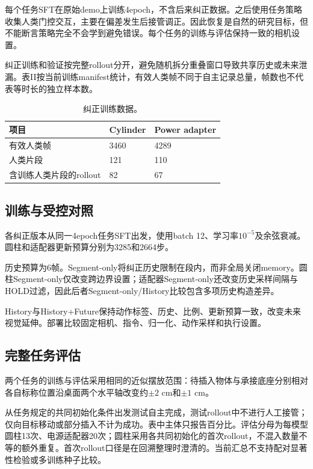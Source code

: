 \documentclass[letterpaper,10pt,conference]{ieeeconf}
\begin{document}
每个任务SFT在原始demo上训练4epoch，不含后来纠正数据。之后使用任务策略收集人类门控交互，主要在偏差发生后接管调正。因此恢复是自然的研究目标，但不能断言策略完全不会学到避免错误。每个任务的训练与评估保持一致的相机设置。

纠正训练和验证按完整rollout分开，避免随机拆分重叠窗口导致共享历史或未来泄漏。表II按当前训练manifest统计，有效人类帧不同于自主记录总量，帧数也不代表等时长的独立样本数。

\begin{table}[t]
\centering\small
\setlength{\tabcolsep}{3pt}
\caption{纠正训练数据。}
\begin{tabularx}{\columnwidth}{@{}Xll@{}}
\toprule
项目 & Cylinder & Power adapter \\
\midrule
有效人类帧 & 3460 & 4289 \\
人类片段 & 121 & 110 \\
含训练人类片段的rollout & 82 & 67 \\
\bottomrule
\end{tabularx}
\end{table}

\subsection{训练与受控对照}

各纠正版本从同一4epoch任务SFT出发，使用batch 12、学习率$10^{-5}$及余弦衰减。圆柱和适配器更新预算分别为3285和2664步。

历史预算为6帧。Segment-only将纠正历史限制在段内，而非全局关闭memory。圆柱Segment-only仅改变跨边界设置；适配器Segment-only还改变历史采样间隔与HOLD过滤，因此后者Segment-only/History比较包含多项历史构造差异。

History与History+Future保持动作标签、历史、比例、更新预算一致，改变未来视觉延伸。部署比较固定相机、指令、归一化、动作采样和执行设置。

\subsection{完整任务评估}
两个任务的训练与评估采用相同的近似摆放范围：待插入物体与承接底座分别相对各自标称位置沿桌面两个水平轴改变约$\pm2$ cm和$\pm1$ cm。

从任务规定的共同初始化条件出发测试自主完成，测试rollout中不进行人工接管；仅向目标移动或部分插入不计为成功。表中主体只报告百分比。评估分母为每模型圆柱13次、电源适配器20次；圆柱采用各共同初始化的首次rollout，不混入数量不等的额外重复。首次rollout口径是在回溯整理时澄清的。当前汇总不支持配对显著性检验或多训练种子比较。
\end{document}
